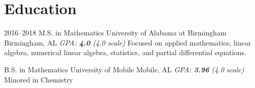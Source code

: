 \section{Education}
\cventry
{2016--2018}
{M.S. in Mathematics}
{University of Alabama at Birmingham}
{Birmingham, AL}
{\textit{GPA: \textbf{4.0} (4.0 scale)}}
{Focused on applied mathematics, linear algebra, numerical linear algebra, statistics, and partial differential equations.}  %

{B.S. in Mathematics}
{University of Mobile}
{Mobile, AL}
{\textit{GPA: \textbf{3.96} (4.0 scale)}}
{Minored in Chemistry}